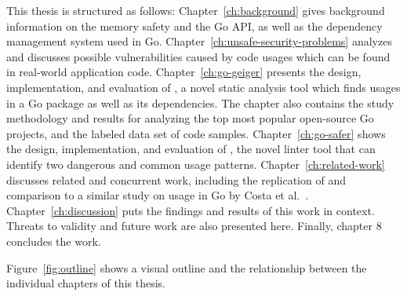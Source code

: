 This thesis is structured as follows: Chapter~\ref{ch:background} gives background information on the memory safety
and the Go \unsafe{} \acrshort{API}, as well as the dependency management system used in Go.
Chapter~\ref{ch:unsafe-security-problems} analyzes and discusses possible vulnerabilities caused by \unsafe{} code
usages which can be found in real-world application code.
Chapter~\ref{ch:go-geiger} presents the design, implementation, and evaluation of \toolGeiger, a novel static analysis
tool which finds \unsafe{} usages in a Go package as well as its dependencies.
The chapter also contains the study methodology and results for analyzing the top \projsTotal{} most popular open-source
Go projects, and the labeled data set of \numberLabeledCodeSnippets{} code samples.
Chapter~\ref{ch:go-safer} shows the design, implementation, and evaluation of \toolSafer, the novel linter tool that
can identify two dangerous and common \unsafe{} usage patterns.
Chapter~\ref{ch:related-work} discusses related and concurrent work, including the replication of and comparison to a
similar study on \unsafe{} usage in Go by Costa et al.~\cite{costa2020}.
Chapter~\ref{ch:discussion} puts the findings and results of this work in context.
Threats to validity and future work are also presented here.
Finally, chapter 8 concludes the work.

Figure~\ref{fig:outline} shows a visual outline and the relationship between the individual chapters of this thesis.


